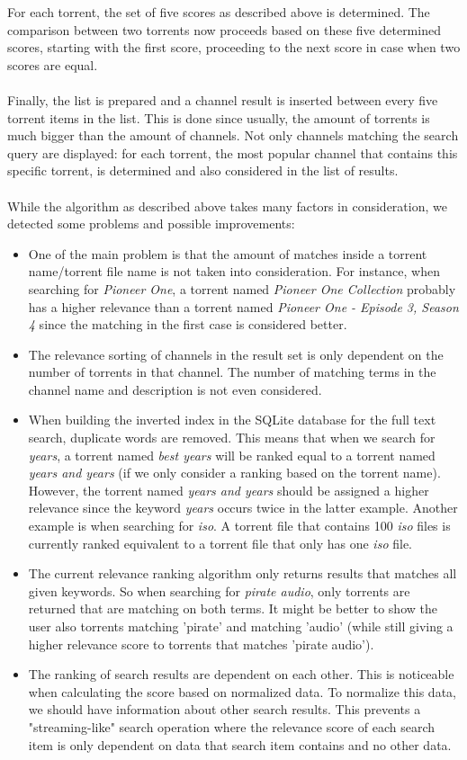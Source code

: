 For each torrent, the set of five scores as described above is determined. The comparison between two torrents now proceeds based on these five determined scores, starting with the first score, proceeding to the next score in case when two scores are equal.\\\\
Finally, the list is prepared and a channel result is inserted between every five torrent items in the list. This is done since usually, the amount of torrents is much bigger than the amount of channels. Not only channels matching the search query are displayed: for each torrent, the most popular channel that contains this specific torrent, is determined and also considered in the list of results.\\\\
While the algorithm as described above takes many factors in consideration, we detected some problems and possible improvements:
\begin{itemize}
	\item One of the main problem is that the amount of matches inside a torrent name/torrent file name is not taken into consideration. For instance, when searching for \emph{Pioneer One}, a torrent named \emph{Pioneer One Collection} probably has a higher relevance than a torrent named \emph{Pioneer One - Episode 3, Season 4} since the matching in the first case is considered better.
	\item The relevance sorting of channels in the result set is only dependent on the number of torrents in that channel. The number of matching terms in the channel name and description is not even considered.
	\item When building the inverted index in the SQLite database for the full text search, duplicate words are removed. This means that when we search for \emph{years}, a torrent named \emph{best years} will be ranked equal to a torrent named \emph{years and years} (if we only consider a ranking based on the torrent name). However, the torrent named \emph{years and years} should be assigned a higher relevance since the keyword \emph{years} occurs twice in the latter example. Another example is when searching for \emph{iso}. A torrent file that contains 100 \emph{iso} files is currently ranked equivalent to a torrent file that only has one \emph{iso} file.
	\item The current relevance ranking algorithm only returns results that matches all given keywords. So when searching for \emph{pirate audio}, only torrents are returned that are matching on both terms. It might be better to show the user also torrents matching 'pirate' and matching 'audio' (while still giving a higher relevance score to torrents that matches 'pirate audio').
	\item The ranking of search results are dependent on each other. This is noticeable when calculating the score based on normalized data. To normalize this data, we should have information about other search results. This prevents a "streaming-like" search operation where the relevance score of each search item is only dependent on data that search item contains and no other data.
\end{itemize}

